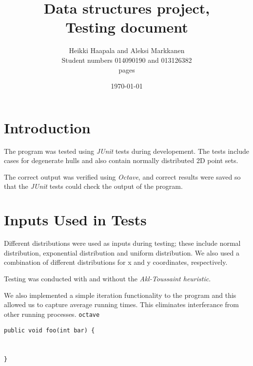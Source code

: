 \documentclass[a4paper,12pt,leqno,titlepage]{article}
\begin{document}
\begin{titlepage}
\title{Data structures project, \\
Testing document}
\author{Heikki Haapala and Aleksi Markkanen\\
Student numbers 014090190 and 013126382\\
\pageref{LastPage} pages}
\date{\today}
\end{titlepage}
\maketitle
\pagebreak
\tableofcontents
\pagebreak

\section{Introduction}
The program was tested using \emph{JUnit} tests during developement.
The tests include cases for degenerate hulls and also contain normally distributed 2D point sets.

The correct output was verified using \emph{Octave}, and correct results were saved so that the \emph{JUnit} tests could check the output of the program.


\pagebreak
\section{Inputs Used in Tests}
Different distributions were used as inputs during testing; these include normal distribution, exponential distribution and uniform distribution. We also used a combination of different distributions for x and y coordinates, respectively.

Testing was conducted with and without the \emph{Akl-Toussaint heuristic}.

We also implemented a simple iteration functionality to the program and this allowed us to capture average running times.
This eliminates interferance from other running processes.
\texttt{octave}

\begin{verbatim}
public void foo(int bar) {


}

\end{verbatim}
\end{document}
